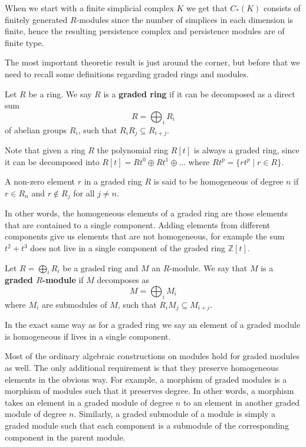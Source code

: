 When we start with a finite simplicial complex $K$ we get that $C_{*}(K)$ consists of finitely generated $R$-modules since the number of simplices in each dimension is finite, hence the resulting persistence complex and persistence modules are of finite type.

The most important theoretic result is just around the corner, but before that we need to recall some definitions regarding graded rings and modules.

\begin{definition}
  Let $R$ be a ring. We say $R$ is a \textbf{graded ring} if it can be decomposed as a direct sum
  \[ R = \bigoplus_{i} R_{i}\]
  of abelian groups $R_{i}$, such that $R_{i}R_{j} \subseteq R_{i+j}$.
\end{definition}
Note that given a ring $R$ the polynomial ring $R[t]$ is always a graded ring, since it can be decomposed into $R[t] = Rt^{0} \oplus Rt^{1} \oplus \dots$ where $Rt^{p}= \{rt^{p} \mid r \in R\}$.

\begin{definition}
A non-zero element $r$ in a graded ring $R$ is said to be homogeneous of degree $n$ if $r \in R_{n}$ and $r \not \in R_{j}$ for all $j \neq n$.
\end{definition}

In other words, the homogeneous elements of a graded ring are those elements that are contained to a single component. Adding elements from different components give us elements that are not homogeneous, for example the sum $t^{2}+t^{3}$ does not live in a single component of the graded ring $\mathbb{Z}[t]$.
\begin{definition}
  Let $R = \bigoplus_{{i}} R_{i}$ be a graded ring and $M$ an $R$-module. We say that $M$ is a \textbf{graded $R$-module} if $M$ decomposes as
  \[M = \bigoplus_{i} M_{i} \]
  where $M_{i}$ are submodules of $M$, such that $R_{i}M_{j} \subseteq M_{i+j}$.
\end{definition}
In the exact same way as for a graded ring we say an element of a graded module is homogeneous if lives in a single component.

Most of the ordinary algebraic constructions on modules hold for graded modules as well. The only additional requirement is that they preserve homogeneous elements in the obvious way. For example, a morphism of graded modules is a morphism of modules such that it preserves degree. In other words, a morphism takes an element in a graded module of degree $n$ to an element in another graded module of degree $n$. Similarly, a graded submodule of a module is simply a graded module such that each component is a submodule of the corresponding component in the parent module.

